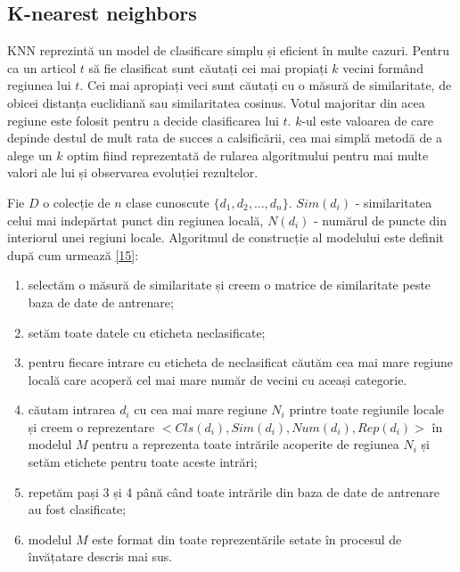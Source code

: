 \subsection{K-nearest neighbors}
KNN reprezintă un model de clasificare simplu și eficient în multe cazuri. Pentru ca un articol $t$ să fie clasificat sunt căutați cei mai propiați $k$ vecini formând regiunea lui $t$. Cei mai apropiați veci sunt căutați cu o măsură de similaritate, de obicei distanța euclidiană sau similaritatea cosinus. Votul majoritar din acea regiune este folosit pentru a decide clasificarea lui $t$. $k$-ul este valoarea de care depinde destul de mult rata de succes a calsificării, cea mai simplă metodă de a alege un $k$ optim fiind reprezentată de rularea algoritmului pentru mai multe valori ale lui și observarea evoluției rezultelor.

\vspace{5mm}
Fie $D$ o colecție de $n$ clase cunoscute $\{d_1, d_2,..., d_n\}$. $Sim(d_i)$ - similaritatea celui mai indepărtat punct din regiunea locală, $N(d_i)$ - numărul de puncte din interiorul unei regiuni locale. Algoritmul de construcție al modelului este definit după cum urmează \hyperlink{gongdeguo}{[15]}:
\begin{enumerate}
	\item selectăm o măsură de similaritate și creem o matrice de similaritate peste baza de date de antrenare;
	\item setăm toate datele cu eticheta neclasificate;
	\item pentru fiecare intrare cu eticheta de neclasificat căutăm cea mai mare regiune locală care acoperă cel mai mare număr de vecini cu aceași categorie.
	\item căutam intrarea $d_i$ cu cea mai mare regiune $N_i$ printre toate regiunile locale și creem o reprezentare $<Cls(d_i), Sim(d_i), Num(d_i), Rep(d_i)>$ în modelul $M$ pentru a reprezenta toate intrările acoperite de regiunea $N_i$ și setăm etichete pentru toate aceste intrări;
	\item repetăm pași 3 și 4 până când toate intrările din baza de date de antrenare au fost clasificate;
	\item modelul $M$ este format din toate reprezentările setate în procesul de învățatare descris mai sus.
\end{enumerate}


